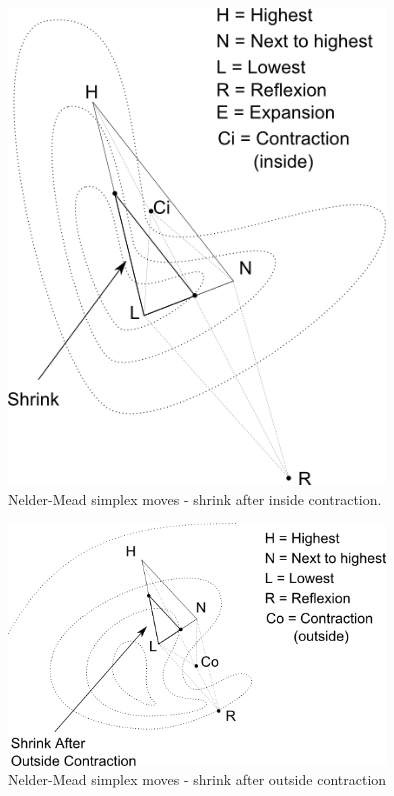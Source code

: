 \begin{figure}
\begin{center}
\includegraphics[width=10cm]{nelder-mead-shrink-afterci.png}
\end{center}
\caption{Nelder-Mead simplex moves - shrink after inside contraction.}
\label{fig-nm-moves-shrinkafterci}
\end{figure}

\begin{figure}
\begin{center}
\includegraphics[width=10cm]{nelder-mead-shrink-afterco.png}
\end{center}
\caption{Nelder-Mead simplex moves - shrink after outside contraction}
\label{fig-nm-moves-shrinkafterco}
\end{figure}

